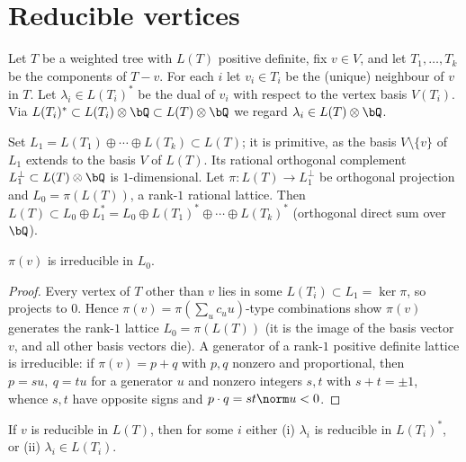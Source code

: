 \section{Reducible vertices}
\label{sec:reducible}

Let $T$ be a weighted tree with $L(T)$ positive definite, fix $v\in V$, and let
$T_1,\dots,T_k$ be the components of $T-v$.  For each $i$ let $v_i\in T_i$ be the (unique)
neighbour of $v$ in $T$.  Let $\lambda_i\in L(T_i)^\ast$ be the dual of $v_i$ with respect to
the vertex basis $V(T_i)$.  Via $L(T_i)^\ast\subset L(T_i)\otimes\bQ\subset L(T)\otimes\bQ$
we regard $\lambda_i\in L(T)\otimes\bQ$.

Set $L_1=L(T_1)\oplus\cdots\oplus L(T_k)\subset L(T)$; it is primitive, as the basis
$V\setminus\{v\}$ of $L_1$ extends to the basis $V$ of $L(T)$.  Its rational orthogonal
complement $L_1^\perp\subset L(T)\otimes\bQ$ is $1$-dimensional.  Let
$\pi:L(T)\to L_1^\perp$ be orthogonal projection and $L_0=\pi(L(T))$, a rank-$1$ rational
lattice.  Then $L(T)\subset L_0\oplus L_1^\ast=L_0\oplus L(T_1)^\ast\oplus\cdots\oplus
L(T_k)^\ast$ (orthogonal direct sum over $\bQ$).

\begin{lem}
\label{lem:irred}
$\pi(v)$ is irreducible in $L_0$.
\end{lem}

\begin{proof}
Every vertex of $T$ other than $v$ lies in some $L(T_i)\subset L_1=\ker\pi$, so projects to
$0$.  Hence $\pi(v)=\pi(\sum_{u}c_uu)$-type combinations show $\pi(v)$ generates the rank-$1$
lattice $L_0=\pi(L(T))$ (it is the image of the basis vector $v$, and all other basis vectors
die).  A generator of a rank-$1$ positive definite lattice is irreducible: if
$\pi(v)=p+q$ with $p,q$ nonzero and proportional, then $p=su,\ q=tu$ for a generator $u$ and
nonzero integers $s,t$ with $s+t=\pm1$, whence $s,t$ have opposite signs and
$p\cdot q=st\norm u<0$.
\end{proof}

\begin{lem}
\label{lem:dichotomy}
If $v$ is reducible in $L(T)$, then for some $i$ either
\textup{(i)} $\lambda_i$ is reducible in $L(T_i)^\ast$, or \textup{(ii)} $\lambda_i\in L(T_i)$.
\end{lem}

